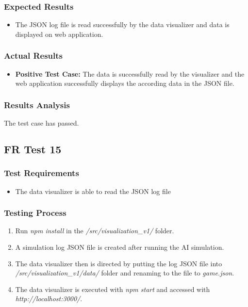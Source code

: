 \documentclass[12pt, titlepage]{article}
\begin{document}
\subsubsection{Expected Results}
\begin{itemize}
    \item The JSON log file is read successfully by the data visualizer and data is displayed on web application.
\end{itemize}
\subsubsection{Actual Results}
\begin{itemize}
    \item \textbf{Positive Test Case:} The data is successfully read by the visualizer and the web application successfully displays the according data in the JSON file.
\end{itemize}
\subsubsection{Results Analysis}
The test case has passed.
\subsection{FR Test 15}
\subsubsection{Test Requirements}
\begin{itemize}
    \item The data visualizer is able to read the JSON log file
\end{itemize}
\subsubsection{Testing Process}
\begin{enumerate}
    \item Run \textit{npm install} in the \textit{/src/visualization\_v1/} folder.
    \item A simulation log JSON file is created after running the AI simulation.
    \item The data visualizer then is directed by putting the log JSON file into \textit{/src/visualization\_v1/data/} folder and renaming to the file to \textit{game.json}.
    \item The data visualizer is executed with \textit{npm start} and accessed with \textit{http://localhost:3000/}.
\end{enumerate}
\end{document}
